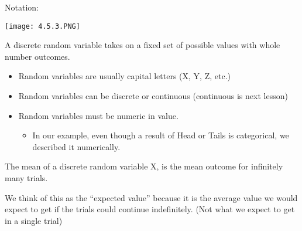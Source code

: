 \documentclass[../stats.tex]{subfiles}
\begin{document}
Notation:
\begin{center}
    \texttt{[image: 4.5.3.PNG]}
\end{center}

A discrete random variable takes on a fixed set of possible values with whole number outcomes.
\begin{itemize}
    \item Random variables are usually capital letters (X, Y, Z, etc.)
    \item Random variables can be discrete or continuous (continuous is next lesson)
    \item Random variables must be numeric in value.
    \begin{itemize}
        \item In our example, even though a result of Head or Tails is categorical, we described it numerically.
    \end{itemize}
\end{itemize}

The mean of a discrete random variable X, is the mean outcome for infinitely many trials.

We think of this as the ``expected value'' because it is the average value we would expect to get if the trials could continue indefinitely. (Not what we expect to get in a single trial)
\end{document}
